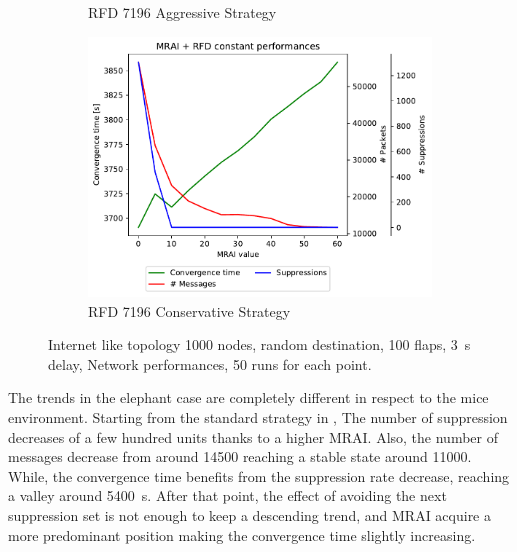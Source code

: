 \begin{figure}[h]
\begin{subfigure}[b]{0.49\textwidth}
         \caption{RFD 7196 Aggressive Strategy}
         \label{fig:1000_7196RFDA_multiMRAI_elephants}
     \end{subfigure}
     \begin{subfigure}[b]{0.49\textwidth}
         \centering
         \includegraphics[width=\textwidth]{images/RFD/miceVSelephants/MultiMRAI/elephants/cisco_1000_RFD_7196_conservative-constant_mrai_rfd_evolution.pdf}
         \caption{RFD 7196 Conservative Strategy}
         \label{fig:1000_7196RFDC_multiMRAI_elephants}
     \end{subfigure}
		\caption{Internet like topology \num{1000} nodes, random destination,
				\num{100} flaps, \SI{3}{\second} delay, Network performances,
				\num{50} runs for each point.}
        \label{fig:1000_RFD_multiMRAI_elephants}
\end{figure}

The trends in the elephant case are completely different in respect to the
mice environment.
Starting from the standard strategy in ,
The number of suppression decreases of a few hundred units
thanks to a higher \ac{MRAI}.
Also, the number of messages decrease from around \num{14500} reaching a stable
state around \num{11000}.
While, the convergence time benefits from the suppression rate decrease, reaching
a valley around \SI{5400}{\second}.
After that point, the effect of avoiding the next suppression set is not enough to keep
a descending trend, and \ac{MRAI} acquire a more predominant position making
the convergence time slightly increasing.

